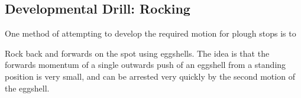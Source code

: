 \subsection{Developmental Drill: Rocking}
\label{drill:stopping/plough/rocking}

One method of attempting to develop the required motion for plough stops is to   

Rock back and forwards on the spot using eggshells. The idea is that the forwards momentum of a single outwards push of an eggshell from a standing position is very small, and can be arrested very quickly by the second motion of the eggshell.  
